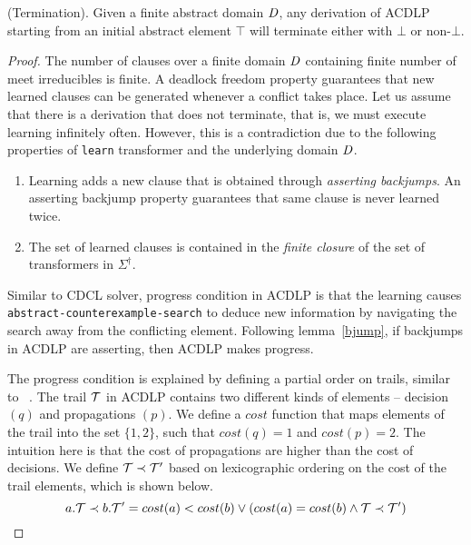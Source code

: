 \begin{theorem} (Termination).
Given a finite abstract domain $\mathit{D}$, any derivation of ACDLP starting from an 
initial abstract element $\top$ will terminate either with $\bot$ or non-$\bot$.
\end{theorem}
%
\begin{proof}	

The number of clauses over a finite domain $\mathit{D}$ containing finite number of 
meet irreducibles is finite.   
A deadlock freedom property guarantees that new learned clauses can be generated 
whenever a conflict takes place.  Let us 
assume that there is a derivation that does not terminate, that is, we must execute 
learning infinitely often.  However, this is a contradiction due to the following 
properties of \texttt{learn} transformer and the underlying domain $\mathit{D}$. 
%
\begin{enumerate}
\item	Learning adds a new clause that is obtained through \emph{asserting backjumps}.  
	An asserting backjump property guarantees that same clause is never learned twice. 

\item  The set of learned clauses is contained in the \emph{finite closure} of the set of 
       transformers in $\Sigma^\dagger$. 
\end{enumerate} 
%


Similar to CDCL solver, progress condition in ACDLP is that the learning causes 
\texttt{abstract-counterexample-search} to deduce new information by navigating 
the search away from the conflicting element. Following lemma~\ref{bjump}, if 
backjumps in ACDLP are asserting, then ACDLP makes progress. 

The progress condition is explained by defining a partial order on trails, similar to 
~\cite{mcsat1}. The trail $\mathcal{T}$ in ACDLP contains two different kinds of elements -- 
decision $(q)$ and propagations $(p)$.  We define a $cost$ function that maps elements of 
the trail into the set $\{1,2\}$, such that $cost(q)=1$ and $cost(p)=2$.  The intuition 
here is that the cost of propagations are higher than the cost of decisions.  We define 
$\mathcal{T}\prec \mathcal{T}'$ based on lexicographic ordering on the cost of the trail 
elements, which is shown below.
\[
   a.\mathcal{T} \prec b.\mathcal{T}' = cost(a) < cost(b) \vee (cost(a) = cost(b) \wedge \mathcal{T} \prec \mathcal{T}')
\]


\end{proof}
